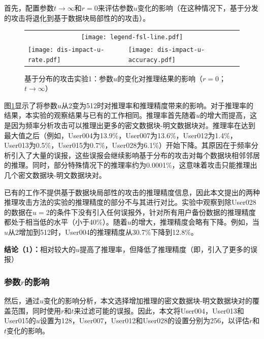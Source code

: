 首先，配置参数$t \rightarrow \infty$和$r = 0$来评估参数$u$变化的影响（在这种情况下，基于分发的攻击将退化到基于数据块局部性的的攻击）。

\begin{figure}[!htbp]
    \centering
    \begin{tabular}{p{.48\linewidth}p{.48\linewidth}}
        \multicolumn{2}{c}{\texttt{[image: legend-fsl-line.pdf]}}  \\
        \texttt{[image: dis-impact-u-rate.pdf]} &
        \texttt{[image: dis-impact-u-accuracy.pdf]}\\
    \end{tabular}
    \caption{基于分布的攻击实验1：参数$u$的变化对推理结果的影响（$r = 0$；$t \rightarrow \infty$）}
    \label{fig:distribution-impact-u}
\end{figure}

图\ref{fig:distribution-impact-u}显示了将参数$u$从2变为512时对推理率和推理精度带来的影响。对于推理率的结果，本实验的观察结果与已有的工作相同。推理率首先随着$u$的增大而提高，这是因为频率分析攻击可以推理出更多的密文数据块-明文数据块对。推理率在达到最大值之后（例如，User004为13.9\%，User007为13.6\%，User012为1.4\%，User013为0.5\%，User015为0.7\%，User028为6.1\%）开始下降。其原因在于频率分析引入了大量的误报，这些误报会继续影响基于分布的攻击对每个数据块相邻邻居的推理。同时，部分特殊情况下的推理率约为0.0001\%，这意味着攻击只能推理出几个密文数据块-明文数据块对。

已有的工作不提供基于数据块局部性的攻击的推理精度信息，因此本文提出的两种推理攻击方法的实验的推理精度的部分不与其进行对比。实验中观察到除User028的数据在$u=2$的条件下没有引入任何误报外，针对所有用户备份数据的推理精度都处于相当低的水平（小于40\%）。随着$u$的增大，推理精度会略有下降。例如，当$u$从2增加到512时，User004的推理精度从30.7\%下降到12.8\%。
    
\textbf{结论（1）：}相对较大的$u$提高了推理率，但降低了推理精度（即，引入了更多的误报）


\subsubsection{参数$r$的影响}

然后，通过$u$变化的影响分析，本文选择增加推理的密文数据块-明文数据块对的覆盖范围，同时使用$r$和$t$来过滤可能的误报。因此，本文将User004，User013和User015的$u$设置为128，User007，User012和User028的设置分别为256，以评估$r$和$t$变化的影响。 

